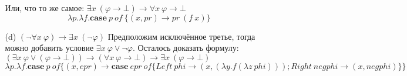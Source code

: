 \begin{enumerate}
\begin{enumerate}
Или, что то же самое:  $\exists x\ (\varphi \to \bot) \to \forall x\ \varphi \to \bot$
\begin{equation*}
	\lambda p. \lambda f. \mathbf{case} \ p \ of \ \{(x, pr) \to pr \ (f \ x)\}
\end{equation*}
\item[(d)] $(\neg \forall x\ \varphi) \to \exists x\ (\neg \varphi)$
Предположим исключённое третье, тогда можно добавить условие $\exists  x \ \varphi \lor \neg \varphi$. Осталось 
доказать формулу: $(\exists x\ \varphi \lor (\varphi\to \bot)) \to (\forall x\ \varphi \to \bot) \to \exists x\ ( 
\varphi \to \bot)$
\begin{equation*}
	\lambda p .\lambda f. \mathbf{case} \ p \ of \{ (x, epr) \to \mathbf{case} \ epr \ of \{ Left \ phi \to (x, 
	(\lambda y. f (\lambda z\ phi))); Right \ negphi \to (x, negphi) \} \}
\end{equation*}
\end{enumerate}

\end{enumerate}
